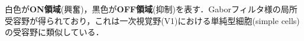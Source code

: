 白色が\textbf{ON領域}(興奮)，黒色が\textbf{OFF領域}(抑制)を表す．Gaborフィルタ様の局所受容野が得られており，これは一次視覚野(V1)における単純型細胞(simple cells)の受容野に類似している．
